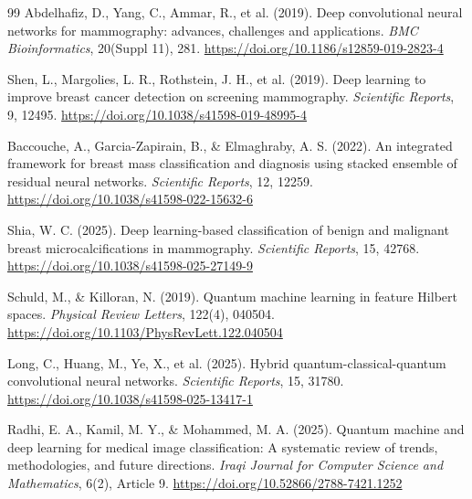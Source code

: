 \begin{thebibliography}{99}
    Abdelhafiz, D., Yang, C., Ammar, R., et al. (2019). Deep convolutional neural networks for mammography:
    advances, challenges and applications. \textit{BMC Bioinformatics}, 20(Suppl 11), 281.
    \url{https://doi.org/10.1186/s12859-019-2823-4}

    Shen, L., Margolies, L. R., Rothstein, J. H., et al. (2019). Deep learning to improve breast cancer
    detection on screening mammography. \textit{Scientific Reports}, 9, 12495.
    \url{https://doi.org/10.1038/s41598-019-48995-4}

    Baccouche, A., Garcia-Zapirain, B., \& Elmaghraby, A. S. (2022). An integrated framework for breast mass
    classification and diagnosis using stacked ensemble of residual neural networks. \textit{Scientific Reports}, 12, 12259.
    \url{https://doi.org/10.1038/s41598-022-15632-6}

    Shia, W. C. (2025). Deep learning-based classification of benign and malignant breast microcalcifications in
    mammography. \textit{Scientific Reports}, 15, 42768.
    \url{https://doi.org/10.1038/s41598-025-27149-9}

    Schuld, M., \& Killoran, N. (2019). Quantum machine learning in feature {H}ilbert spaces.
    \textit{Physical Review Letters}, 122(4), 040504.
    \url{https://doi.org/10.1103/PhysRevLett.122.040504}

    Long, C., Huang, M., Ye, X., et al. (2025). Hybrid quantum-classical-quantum convolutional neural networks.
    \textit{Scientific Reports}, 15, 31780.
    \url{https://doi.org/10.1038/s41598-025-13417-1}

    Radhi, E. A., Kamil, M. Y., \& Mohammed, M. A. (2025). Quantum machine and deep learning for medical image
    classification: A systematic review of trends, methodologies, and future directions. \textit{Iraqi Journal for Computer
    Science and Mathematics}, 6(2), Article 9.
    \url{https://doi.org/10.52866/2788-7421.1252}


\end{thebibliography}
